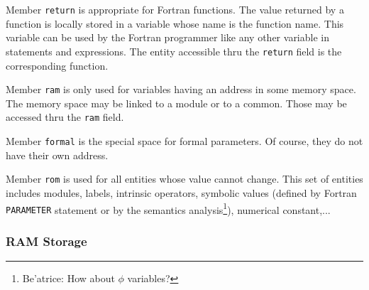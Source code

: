 \iffalse
Le domaine \verb/storage/ permet de pre'ciser dans quelle zone de la
me'moire est stocke'e une entite'. Il y a plusieurs zones, qui ne
correspondent pas ne'cessairement a` la re'alite', c'est-a`-dire aux
zones de me'moire qui seraient affecte'es par un compilateur.
\fi

Member {\tt return} is appropriate for Fortran functions. The value
returned by a function is locally stored in a variable whose name is the
function name. This variable can be used by the Fortran programmer like
any other variable in statements and expressions. The entity accessible
thru the {\tt return} field is the corresponding function.

\iffalse
Le sous-domaine \verb/return/ permet de repre'senter les variables ayant
pour nom le nom d'une fonction et auxquelles on affecte la valeur que la
fonction doit retourner. L'entite' pointe'e par \verb/return/ est la
fonction concerne'e.
\fi

Member {\tt ram} is only used for variables having an address in
some memory space. The memory space may be linked to a module or to a
common. Those may be accessed thru the {\tt ram} field.

\iffalse
Le sous-domaine \verb/ram/ est reserve' aux variables ayant une adresse
en me'moire. Il permet de pre'ciser dans quelle fonction et
e'ventuellement dans quel common ces variables ont e'te' de'clare'es.
\fi

Member {\tt formal} is the special space for formal parameters. Of
course, they do not have their own address.

\iffalse
Le sous-domaine \verb/formal/ est re'serve' aux parame`tres formels des
modules.
\fi

Member {\tt rom} is used for all entities whose value cannot
change. This set of entities includes modules, labels, intrinsic
operators, symbolic values (defined by Fortran {\tt PARAMETER} statement
or by the semantics analysis\footnote{Be'atrice: How about $\phi$
variables?}), numerical constant,...

\iffalse
Le sous-domaine \verb/rom/ est utilise' pour toutes les entite's dont la
valeur n'est pas modifiable, telles que les fonctions, les labels, les
ope'rateurs, etc.
\fi

\subsubsection{RAM Storage}
\label{subsubsection-ram}

{}

